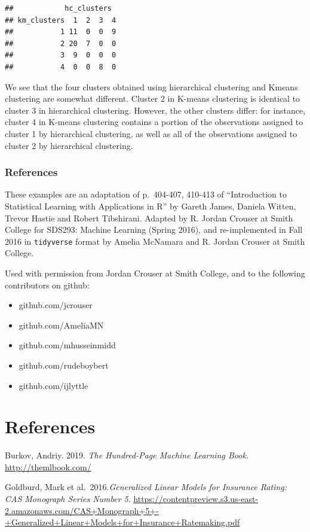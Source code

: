 \documentclass[
  openany]{book}
\providecommand{\tightlist}{%
  \setlength{\itemsep}{0pt}\setlength{\parskip}{0pt}}
\begin{document}
\begin{verbatim}
##            hc_clusters
## km_clusters  1  2  3  4
##           1 11  0  0  9
##           2 20  7  0  0
##           3  9  0  0  0
##           4  0  0  8  0
\end{verbatim}

We see that the four clusters obtained using hierarchical clustering and Kmeans
clustering are somewhat different. Cluster 2 in K-means clustering is
identical to cluster 3 in hierarchical clustering. However, the other clusters
differ: for instance, cluster 4 in K-means clustering contains a portion of
the observations assigned to cluster 1 by hierarchical clustering, as well as
all of the observations assigned to cluster 2 by hierarchical clustering.

\hypertarget{references-1}{%
\subsection{References}\label{references-1}}

These examples are an adaptation of p.~404-407, 410-413 of ``Introduction to
Statistical Learning with Applications in R'' by Gareth James, Daniela Witten, Trevor Hastie and Robert
Tibshirani. Adapted by R. Jordan Crouser at Smith College for SDS293: Machine Learning (Spring 2016), and re-implemented in Fall 2016 in \texttt{tidyverse} format by Amelia McNamara and R. Jordan Crouser at Smith College.

Used with permission from Jordan Crouser at Smith College, and to the following contributors on github:

\begin{itemize}
\tightlist
\item
  github.com/jcrouser
\item
  github.com/AmeliaMN
\item
  github.com/mhusseinmidd
\item
  github.com/rudeboybert
\item
  github.com/ijlyttle
\end{itemize}

\hypertarget{references-2}{%
\chapter{References}\label{references-2}}

Burkov, Andriy. 2019. \emph{The Hundred-Page Machine Learning Book.} \url{http://themlbook.com/}

Goldburd, Mark et al.~2016.\emph{Generalized Linear Models for Insurance Rating: CAS Monograph Series Number 5}. \url{https://contentpreview.s3.us-east-2.amazonaws.com/CAS+Monograph+5+-+Generalized+Linear+Models+for+Insurance+Ratemaking.pdf}
\end{document}
